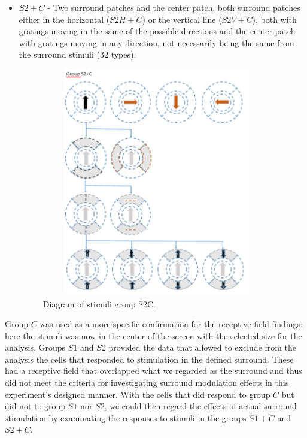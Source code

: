 \begin{itemize}
\item $S2+C$ - Two surround patches and the center patch, both surround patches either in the horizontal ($S2H+C$) or the vertical line ($S2V+C$), both with gratings moving in the same of the possible directions and the center patch with gratings moving in any direction, not necessarily being the same from the surround stimuli (32 types).

\begin{figure}[H] \centering \includegraphics[width=10cm,height=10cm,keepaspectratio]{Figures/4.Chapter/S2C.PNG} \caption{Diagram of stimuli group S2C.} \end{figure}

\end{itemize}

Group $C$ was used as a more specific confirmation for the receptive field findings: here the stimuli was now in the center of the screen with the selected size for the analysis. Groups $S1$ and $S2$ provided the data that allowed to exclude from the analysis the cells that responded to stimulation in the defined surround. These had a receptive field that overlapped what we regarded as the surround and thus did not meet the criteria for investigating surround modulation effects in this experiment's designed manner. With the cells that did respond to group $C$ but did not to group $S1$ nor $S2$, we could then regard the effects of actual surround stimulation by examinating the responses to stimuli in the groups $S1+C$ and $S2+C$.